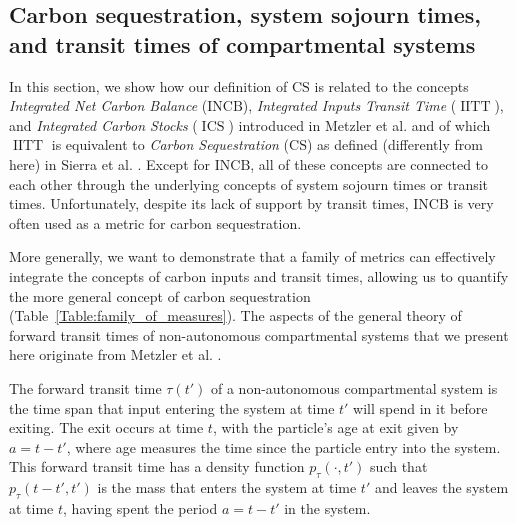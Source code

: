 \documentclass[9pt,twoside]{pnas-new}
\newcommand{\CS}{\mathrm{CS}}
\newcommand{\INCB}{\mathrm{INCB}}
\newcommand{\IITT}{\operatorname{IITT}}
\newcommand{\ICS}{\operatorname{ICS}}
\begin{document}
\subsection*{Carbon sequestration, system sojourn times, and transit times of compartmental systems}
In this section, we show how our definition of $\CS$ is related to the concepts 
\emph{Integrated Net Carbon Balance} ($\INCB$), \emph{Integrated Inputs Transit Time} ($\IITT$), and \emph{Integrated Carbon Stocks} ($\ICS$) introduced in Metzler et al. \cite{Metzler2024} and of which $\IITT$ is equivalent to \emph{Carbon Sequestration} ($\CS$) as defined (differently from here) in Sierra et al. \cite{Sierra2021}.
Except for $\INCB$, all of these concepts are connected to each other through the underlying concepts of system sojourn times or transit times.
Unfortunately, despite its lack of support by transit times, $\INCB$ is very often used as a metric for carbon sequestration.

More generally, we want to demonstrate that a family of metrics can effectively integrate the concepts of carbon inputs and transit times, allowing us to quantify the more general concept of carbon sequestration (Table~\ref{Table:family_of_measures}).
The aspects of the general theory of forward transit times of non-autonomous compartmental systems that we present here originate from Metzler et al. \cite{Metzler2018PNAS}.

The forward transit time $\tau(t')$ of a non-autonomous compartmental system is the time span that input entering the system at time $t'$ will spend in it before exiting.
The exit occurs at time $t$, with the particle's age at exit given by $a=t-t'$, where age measures the time since the particle entry into the system.
This forward transit time has a density function $p_\tau(\cdot,t')$ such that $p_\tau(t-t',t')$ is the mass that enters the system at time $t'$ and leaves the system at time $t$, having spent the period $a=t-t'$ in the system.
\end{document}
